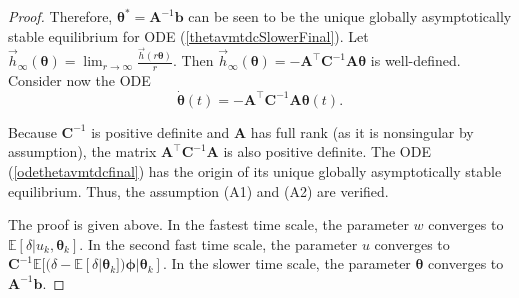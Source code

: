 \begin{proof}
    Therefore,
    ${\bm{\theta}}^*=\textbf{A}^{-1}{\bm{b}}$ can be seen to be the unique globally asymptotically
    stable equilibrium for ODE (\ref{thetavmtdcSlowerFinal}).
    Let $\vec{h}_{\infty}({\bm{\theta}})=\lim_{r\rightarrow
    \infty}\frac{\vec{h}(r{\bm{\theta}})}{r}$. Then
    $\vec{h}_{\infty}({\bm{\theta}})=-\textbf{A}^{\top}\textbf{C}^{-1}\textbf{A}{\bm{\theta}}$ is well-defined. 
    Consider now the ODE
    \begin{equation}
    \dot{{\bm{\theta}}}(t)=-\textbf{A}^{\top}\textbf{C}^{-1}\textbf{A}{\bm{\theta}}(t).
    \label{odethetavmtdcfinal}
    \end{equation}
    
    Because $\textbf{C}^{-1}$ is positive definite and $\textbf{A}$ has full rank (as it
    is nonsingular by assumption), the matrix $\textbf{A}^{\top} \textbf{C}^{-1}\textbf{A}$ is also
    positive definite. 
    The ODE (\ref{odethetavmtdcfinal}) has the origin of its unique globally asymptotically stable equilibrium.
    Thus, the assumption (A1) and (A2) are verified.
    
    The proof is given above.
    In the fastest time scale, the parameter $w$ converges to
    $\mathbb{E}[\delta|{u}_k,{\bm{\theta}}_k]$.
    In the second fast time scale,
    the parameter $u$ converges to $\textbf{C}^{-1}\mathbb{E}[(\delta-\mathbb{E}[\delta|{\bm{\theta}}_k]){\bm{\phi}}|{\bm{\theta}}_k]$.
    In the slower time scale,
    the parameter ${\bm{\theta}}$ converges to $\textbf{A}^{-1}{\bm{b}}$.
    \end{proof}

   
